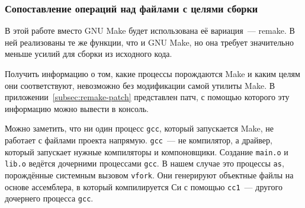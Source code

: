 \subsubsection{Сопоставление операций над файлами с целями сборки}
\label{subsubsec:link-ops-with-targets}

В этой работе вместо GNU Make будет использована её вариация~--- remake. В ней реализованы те же функции, что и GNU Make, но она требует значительно меньше усилий для сборки из исходного кода.

Получить информацию о том, какие процессы порождаются Make и каким целям они соответствуют, невозможно без модификации самой утилиты Make. В приложении~\ref{subsec:remake-patch} представлен патч, с помощью которого эту информацию можно вывести в консоль.



Можно заметить, что ни один процесс \texttt{gcc}, который запускается Make, не работает с файлами проекта напрямую. \texttt{gcc}~--- не компилятор, а драйвер, который запускает нужные компиляторы и компоновщики. Создание \texttt{main.o} и \texttt{lib.o} ведётся дочерними процессами \texttt{gcc}. В нашем случае это процессы \texttt{as}, порождённые системным вызовом \texttt{vfork}. Они генерируют объектные файлы на основе ассемблера, в который компилируется Си с помощью \texttt{cc1}~--- другого дочернего процесса \texttt{gcc}.

